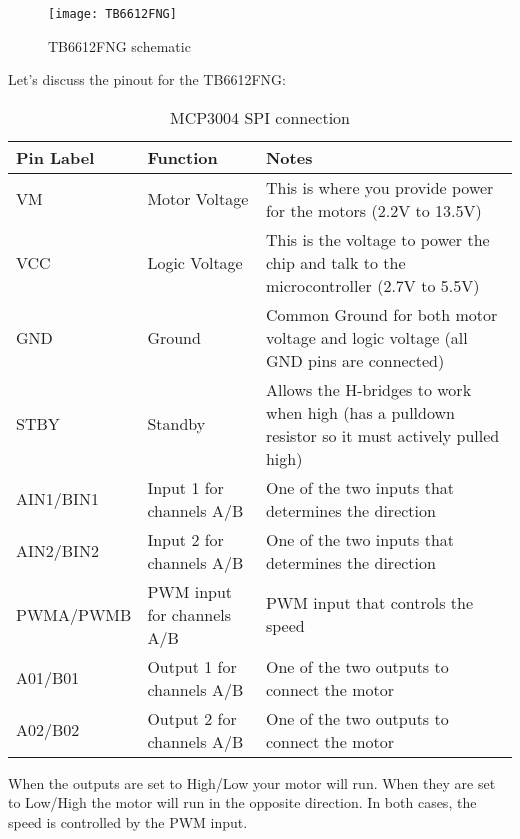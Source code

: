 \documentclass[
12pt, %
a4paper, %
oneside, %
headinclude,footinclude, %
BCOR5mm, %
]{scrartcl}
\begin{document}
\begin{figure}[!htb]
\centering
\texttt{[image: TB6612FNG]} 
\caption[TB6612FNG schematic]{TB6612FNG schematic}
\label{fig:TB6612FNG}
\end{figure}
Let’s discuss the pinout for the TB6612FNG:


\newcolumntype{b}{X}

\begin{table}[hbt]
\caption{MCP3004 SPI connection}
\centering
\begin{adjustwidth}{-1cm}{}
\resizebox{16cm}{!} {%
\begin{tabularx}{18cm}{smb}
\toprule
Pin Label & Function & Notes \\
\midrule
VM & Motor Voltage  & This is where you provide power for the motors (2.2V to 13.5V)\\
VCC & Logic Voltage & This is the voltage to power the chip and talk to the microcontroller (2.7V to 5.5V)\\
GND & Ground  & Common Ground for both motor voltage and logic voltage (all GND pins are connected)\\
STBY & Standby & Allows the H-bridges to work when high (has a pulldown resistor so it must actively pulled high)\\
AIN1/BIN1 & Input 1 for channels A/B   & One of the two inputs that determines the direction\\
AIN2/BIN2 & Input 2 for channels A/B   & One of the two inputs that determines the direction\\
PWMA/PWMB & PWM input for channels A/B & PWM input that controls the speed\\
A01/B01 & Output 1 for channels A/B  & One of the two outputs to connect the motor\\
A02/B02 & Output 2 for channels A/B  & One of the two outputs to connect the motor\\
\bottomrule
\end{tabularx} } 
\end{adjustwidth}
\label{tab:label}
\end{table}

When the outputs are set to High/Low your motor will run. When they are set to Low/High the motor will run in the opposite direction. In both cases, the speed is controlled by the PWM input.
\end{document}
